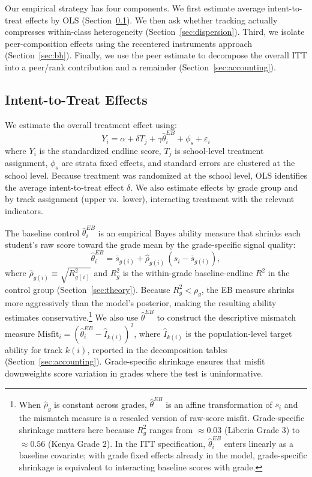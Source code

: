 \documentclass[11pt]{article}
\begin{document}
Our empirical strategy has four components. We first estimate average intent-to-treat effects by OLS (Section~\ref{sec:itt}). We then ask whether tracking actually compresses within-class heterogeneity (Section~\ref{sec:dispersion}). Third, we isolate peer-composition effects using the \citet{borusyak2023nonrandom} recentered instruments approach (Section~\ref{sec:bh}). Finally, we use the peer estimate to decompose the overall ITT into a peer/rank contribution and a remainder (Section~\ref{sec:accounting}).

\subsection{Intent-to-Treat Effects}
\label{sec:itt}

We estimate the overall treatment effect using:
\begin{equation}
\label{eq:itt}
Y_i = \alpha + \delta T_j + \gamma \hat{\theta}^{EB}_i + \phi_s + \varepsilon_i
\end{equation}
where $Y_i$ is the standardized endline score, $T_j$ is school-level treatment assignment, $\phi_s$ are strata fixed effects, and standard errors are clustered at the school level. Because treatment was randomized at the school level, OLS identifies the average intent-to-treat effect $\delta$. We also estimate effects by grade group and by track assignment (upper vs.\ lower), interacting treatment with the relevant indicators.

The baseline control $\hat{\theta}^{EB}_i$ is an empirical Bayes ability measure that shrinks each student's raw score toward the grade mean by the grade-specific signal quality:
\begin{equation}
\label{eq:eb}
\hat{\theta}^{EB}_{i} = \bar{s}_{g(i)} + \hat{\rho}_{g(i)}\,(s_i - \bar{s}_{g(i)}),
\end{equation}
where $\hat{\rho}_{g(i)} \equiv \sqrt{R^2_{g(i)}}$ and $R^2_g$ is the within-grade baseline-endline $R^2$ in the control group (Section~\ref{sec:theory}). Because $R^2_g < \rho_g$, the EB measure shrinks more aggressively than the model's posterior, making the resulting ability estimates conservative.\footnote{When $\hat{\rho}_g$ is constant across grades, $\hat{\theta}^{EB}$ is an affine transformation of $s_i$ and the mismatch measure is a rescaled version of raw-score misfit. Grade-specific shrinkage matters here because $R^2_g$ ranges from $\approx 0.03$ (Liberia Grade 3) to $\approx 0.56$ (Kenya Grade 2). In the ITT specification, $\hat{\theta}^{EB}_i$ enters linearly as a baseline covariate; with grade fixed effects already in the model, grade-specific shrinkage is equivalent to interacting baseline scores with grade.} We also use $\hat{\theta}^{EB}$ to construct the descriptive mismatch measure $\text{Misfit}_i = (\hat{\theta}^{EB}_i - \widehat{I}_{k(i)})^2$, where $\widehat{I}_{k(i)}$ is the population-level target ability for track $k(i)$, reported in the decomposition tables (Section~\ref{sec:accounting}). Grade-specific shrinkage ensures that misfit downweights score variation in grades where the test is uninformative.
\end{document}
